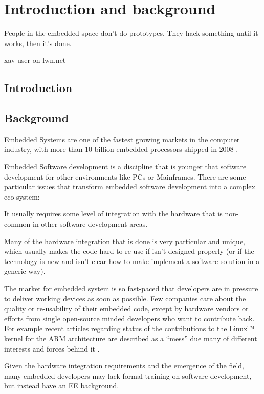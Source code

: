 \chapter{Introduction and background}
\epigraph{People in the embedded space don't do prototypes. They hack something until it works, then it's done.}{xav user on lwn.net}

\section{Introduction}


\section{Background}
Embedded Systems are one of the fastest growing markets in the computer industry, with more than 10 billion embedded processors shipped in 2008 \citep{Clarke:2009uq}.

Embedded Software development is a discipline that is younger that software development for other environments like \acp{PC} or Mainframes. There are some particular issues that transform embedded software development into a complex eco-system:
\begin{itemize*}
\item It usually requires some level of integration with the hardware that is non-common in other software development areas.
\item Many of the hardware integration that is done is very particular and unique, which usually makes the code hard to re-use if isn't designed properly (or if the technology is new and isn't clear how to make implement a software solution in a generic way).
\item The market for embedded system is so fast-paced that developers are in pressure to deliver working devices as soon as possible. Few companies care about the quality or re-usability of their embedded code, except by hardware vendors or efforts from single open-source minded developers who want to contribute back. For example recent articles regarding status of the contributions to the Linux™ kernel for the ARM architecture are described as a ``mess'' due many of different interests and forces behind it \cite{Proffitt:2011fk}.
\item Given the hardware integration requirements and the emergence of the field, many embedded developers may lack formal training on software development, but instead have an \ac{EE} background.
\end{itemize*}

